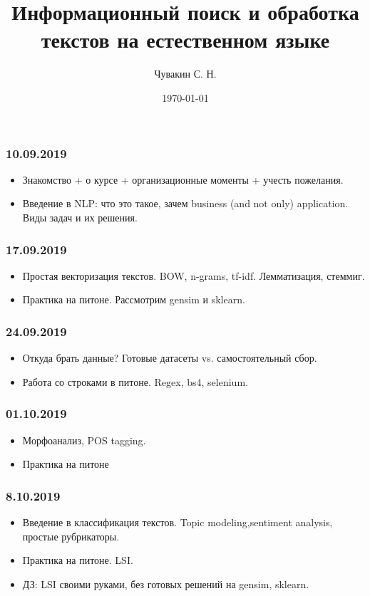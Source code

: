 \documentclass[a4paper,11pt]{article}
\author{Чувакин С. Н.}
\title{Информационный поиск и обработка текстов на естественном языке}
\date{\today}
\begin{document}
	
\maketitle
 
\subsubsection{10.09.2019}
\begin{itemize}
\item Знакомство + о курсе + организационные моменты + учесть пожелания.  
\item Введение в NLP: что это такое, зачем business (and not only) application. Виды задач и их решения. 
\end{itemize}

\subsubsection{17.09.2019}
\begin{itemize}
	\item Простая векторизация текстов. BOW, n-grams, tf-idf. Лемматизация, стеммиг. 
	\item Практика на питоне. Рассмотрим gensim и sklearn.  
\end{itemize}
\subsubsection{24.09.2019}
\begin{itemize}
	\item Откуда брать данные? Готовые датасеты vs. самостоятельный сбор.
	\item Работа со строками в питоне. Regex, bs4, selenium. 
\end{itemize}
\subsubsection{01.10.2019}
\begin{itemize}
	\item Морфоанализ,  POS tagging. 
	\item Практика на питоне 
\end{itemize}
\subsubsection{8.10.2019}
\begin{itemize}
	\item Введение в классификация текстов. Topic modeling,sentiment analysis, простые рубрикаторы.  
	\item Практика на питоне. LSI.
	\item ДЗ: LSI своими руками, без готовых решений на gensim, sklearn. 
\end{itemize}
\end{document}
